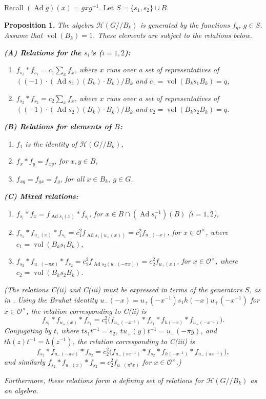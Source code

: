 \documentclass[12pt,letterpaper,reqno]{amsart}
\let\cal\mathcal
\newtheorem{proposition}[theorem]{Proposition}
\theoremstyle{definition}
\theoremstyle{remark}
\numberwithin{equation}{section}
\begin{document}
Recall $(\operatorname{Ad} g)(x)=gxg^{-1}$. Let $S=\{s_1,s_2\}\cup B$.

\begin{proposition}
\label{prop:main}
The algebra ${\cal H}(G//B_k)$ is generated by the functions $f_g$, $g\in S$.
Assume that $\operatorname{vol}(B_k)=1$. These elements are subject to the
relations below.

\noindent
\textbf{(A) Relations for the $s_i$'s ($i=1,2$):}
\begin{enumerate}
\item[(i)] $f_{s_1}*f_{s_1}=c_1\sum_x f_x$, where $x$ runs over a set of
representatives of $((-1)\cdot (\operatorname{Ad} s_1)(B_k)\cdot B_k)/B_k$ and
$c_1=\operatorname{vol}(B_k s_1 B_k)=q$,
\item[(ii)] $f_{s_2}*f_{s_2}=c_2\sum_x f_x$, where $x$ runs over a set of
representatives of $((-1)\cdot (\operatorname{Ad} s_2)(B_k)\cdot B_k)/B_k$ and
$c_2=\operatorname{vol}(B_k s_2 B_k)=q$.
\end{enumerate}

\noindent
\textbf{(B) Relations for elements of $B$:}
\begin{enumerate}
\item[(i)] $f_1$ is the identity of ${\cal H}(G//B_k)$,
\item[(ii)] $f_x*f_y=f_{xy}$, for $x,y\in B$,
\item[(iii)] $f_{xg}=f_{gx}=f_g$, for all $x\in B_k,\ g\in G$.
\end{enumerate}

\noindent
\textbf{(C) Mixed relations:}
\begin{enumerate}
\item[(i)] $f_{s_i}*f_x=f_{\operatorname{Ad} s_i(x)}*f_{s_i}$, for
$x\in B\cap (\operatorname{Ad} s_i^{-1})(B)$ ($i=1,2$),
\item[(ii)] $f_{s_1}*f_{u_+(x)}*f_{s_1}=c_1^2 f_{\operatorname{Ad} s_1(u_+(x))}
=c_1^2 f_{u_-(-x)}$, for $x\in {\cal O}^\times$, where
$c_1=\operatorname{vol}(B_k s_1 B_k)$,
\item[(iii)] $f_{s_2}*f_{u_-(-\pi x)}*f_{s_2}=c_2^2 f_{\operatorname{Ad} s_2(u_-(-\pi x))}
=c_2^2 f_{u_+(x)}$, for $x\in {\cal O}^\times$, where
$c_2=\operatorname{vol}(B_k s_2 B_k)$.
\end{enumerate}

\noindent
(The relations C(ii) and C(iii) must be expressed in terms of the generators
$S$, as in \cite{HM85}. Using the Bruhat identity
$u_-(-x)=u_+(-x^{-1})s_1 h(-x) u_+(-x^{-1})$ for $x\in {\cal O}^\times$, the
relation corresponding to C(ii) is
\[
f_{s_1}*f_{u_+(x)}*f_{s_1}
=c_1^2\bigl(f_{u_+(-x^{-1})}*f_{s_1}*f_{h(-x)}*f_{u_+(-x^{-1})}\bigr).
\]
Conjugating by $t$, where $ts_1t^{-1}=s_2$, $tu_+(y)t^{-1}=u_-(-\pi y)$, and
$th(z)t^{-1}=h(z^{-1})$, the relation corresponding to C(iii) is
\[
f_{s_2}*f_{u_-(-\pi x)}*f_{s_2}
=c_2^2\bigl(f_{u_-(\pi x^{-1})}*f_{s_2}*f_{h(-x^{-1})}*f_{u_-(\pi x^{-1})}\bigr),
\]
and similarly $f_{s_2}*f_{u_+(x)}*f_{s_2}=c_2^2 f_{u_-(\pi^2 x)}$ for
$x\in {\cal O}^\times$.)

Furthermore, these relations form a defining set of relations for
${\cal H}(G//B_k)$ as an algebra.
\end{proposition}
\end{document}
